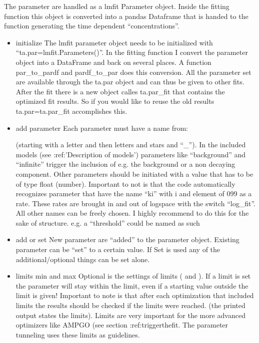 \documentclass[letterpaper,10pt,english]{sphinxmanual}
\begin{document}
The parameter are handled as a lmfit Parameter object. Inside the
fitting function this object is converted into a pandas Dataframe that
is handed to the function generating the time dependent
“concentrations”.
\begin{itemize}
\item {} 
initialize
The lmfit parameter object needs to be initialized with
“ta.par=lmfit.Parameters()”. In the fitting function I convert the
parameter object into a DataFrame and back on several places. A
function par\_to\_pardf and pardf\_to\_par does this conversion. All the
parameter set are available through the ta.par object and can thus be
given to other fits. After the fit there is a new object calles
ta.par\_fit that contains the optimized fit results. So if you would
like to re\sphinxhyphen{}use the old results ta.par=ta.par\_fit accomplishes this.

\item {} 
add parameter
Each parameter must
have a name from:

\begin{sphinxVerbatim}[commandchars=\\\{\}]
\PYG{p}{[}\PYG{p}{]}\PYG{p}{[}\PYG{p}{]}\PYGZbs{}
\end{sphinxVerbatim}

(starting with a letter and then
letters and stars and “\_”). In the included models (see
:ref:’Description of models’) parameters like “background”
and “infinite” trigger the inclusion of e.g. the background or a non
decaying component. Other parameters should be initiated with a value
that has to be of type float (number). Important to not is that the
code automatically recognizes parameter that have the name “ki” with
i and element of 0\sphinxhyphen{}99 as a rate. These rates are brought in and out
of logspace with the switch “log\_fit”. All other names can be freely
chosen. I highly recommend to do this for the sake of structure. e.g.
a “threshold” could be named as such

\item {} 
add or set
New parameter are “added” to the parameter object. Existing
parameter can be “set” to a certain value. If Set is used any of
the additional/optional things can be set alone.

\item {} 
limits min and max
Optional is the settings of limits ( and ). If a limit
is set the parameter will stay within the limit, even if a starting
value outside the limit is given! Important to note is that after
each optimization that included limits the results should be checked
if the limits were reached. (the printed output states the limits).
Limits are very important for the more advanced optimizers like AMPGO
(see section :ref:trigger\sphinxhyphen{}the\sphinxhyphen{}fit. The parameter tunneling
uses these limits as guidelines.


\end{itemize}
\end{document}
